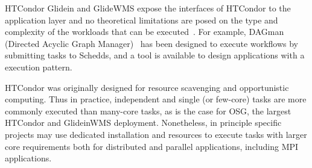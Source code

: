 \documentclass{sig-alternate}
\begin{document}

HTCondor Glidein and GlideWMS expose the interfaces of HTCondor to the
application layer and no theoretical limitations are posed on the type and
complexity of the workloads that can be executed~\cite{couvares2007workflow}.
For example, DAGman (Directed Acyclic Graph Manager)~\cite{frey2002condor} has
been designed to execute workflows by submitting tasks to Schedds, and a \MW
tool is available to design applications with a \MW execution pattern.




HTCondor was originally designed for resource scavenging and opportunistic
computing.  Thus in practice, independent and single (or few-core) tasks are
more commonly executed than many-core tasks, as is the case for OSG, the largest
HTCondor and GlideinWMS deployment. Nonetheless, in principle specific projects
may use dedicated installation and resources to execute tasks with larger core
requirements both for distributed and parallel applications, including MPI
applications.


\end{document}
